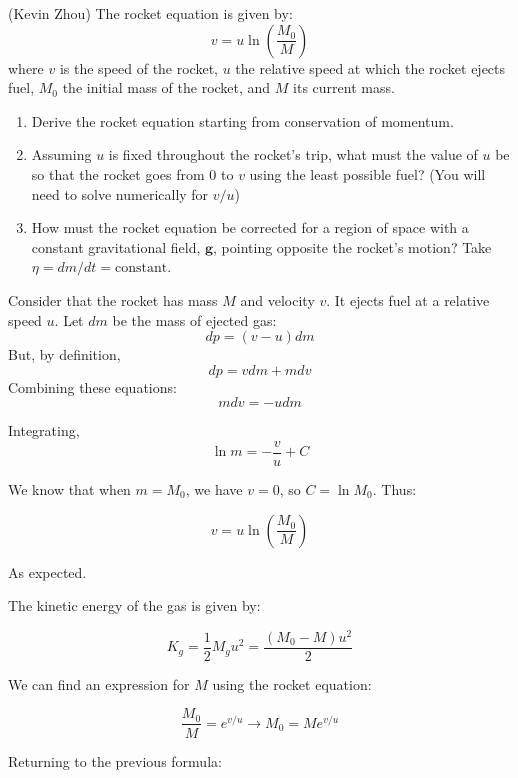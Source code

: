 \documentclass[11pt]{article}
\begin{document}
\begin{pproblem} (Kevin Zhou) The rocket equation is given by:
    \[
    v = u\ln\left(\frac{M_0}{M}\right)
    \]
    where \(v\) is the speed of the rocket, \(u\) the relative speed at which the rocket ejects fuel, \(M_0\) the initial mass of the rocket, and \(M\) its current mass.
    \begin{enumerate}[label=\textbf{\alph*)}]
        \item Derive the rocket equation starting from conservation of momentum.
        \item Assuming \(u\) is fixed throughout the rocket's trip, what must the value of \(u\) be so that the rocket goes from \(0\) to \(v\) using the least possible fuel? (You will need to solve numerically for \(v/u\))
        \item How must the rocket equation be corrected for a region of space with a constant gravitational field, \(\mathbf{g}\), pointing opposite the rocket's motion? Take \(\eta = dm/dt = \text{constant}\).
    \end{enumerate}

    \begin{pssolution*}{}{}
        \begin{alternativas}
            \item Consider that the rocket has mass \(M\) and velocity \(v\). It ejects fuel at a relative speed \(u\). Let \(dm\) be the mass of ejected gas:
            \[dp = (v-u)dm\]
            But, by definition,
            \[dp = vdm + mdv\]
            Combining these equations:
            \[mdv = -udm\]

            Integrating,
            \[\ln m = -\frac{v}{u} + C\]

            We know that when \(m = M_0\), we have \(v = 0\), so \(C = \ln M_0\). Thus:

            \[v = u \ln\left(\frac{M_0}{M}\right)\]

            As expected.

            \item The kinetic energy of the gas is given by:
            
            \[K_{g} =\frac{1}{2}M_gu^2 = \frac{(M_0-M)u^2}{2}\]

            We can find an expression for \(M\) using the rocket equation:

            \[\frac{M_0}{M} = e^{v/u} \rightarrow M_0 = Me^{v/u}\]

            Returning to the previous formula:
            

\end{alternativas}
\end{pssolution*}
\end{pproblem}
\end{document}
